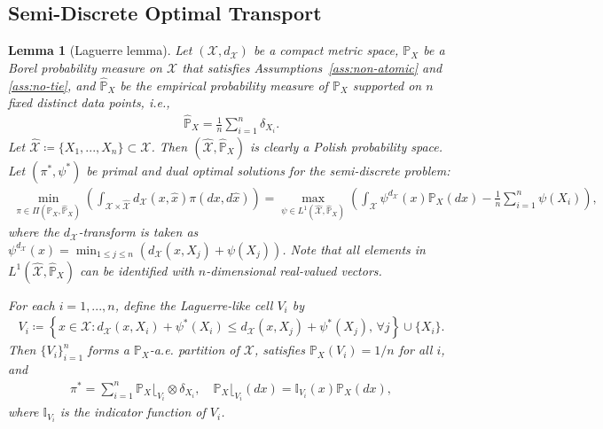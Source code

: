 \documentclass{article}
\theoremstyle{plain}
\newtheorem{lemma}[theorem]{Lemma}
\theoremstyle{definition}
\theoremstyle{remark}
\begin{document}
\subsection{Semi-Discrete Optimal Transport}
\begin{lemma}[Laguerre lemma]
	\label{lem:laguerre}
	Let $(\mathcal{X},d_{\mathcal{X}})$ be a compact metric space, $\mathbb{P}_X$ be a Borel probability measure on $\mathcal{X}$ that satisfies Assumptions~\ref{ass:non-atomic} and \ref{ass:no-tie}, and $\hat{\mathbb{P}}_X$ be the empirical probability measure of $\mathbb{P}_X$ supported on $n$ fixed distinct data points, i.e.,
	\begin{align*}
		\hat{\mathbb{P}}_X = \frac{1}{n} \sum_{i=1}^{n} \delta_{X_i} .
	\end{align*}
	Let $\hat{\mathcal{X}} \coloneqq \{X_1,...,X_n\} \subset \mathcal{X}$. Then $(\hat{\mathcal{X}},\hat{\mathbb{P}}_X)$ is clearly a Polish probability space. Let $(\pi^*,\psi^*)$ be primal and dual optimal solutions for the semi-discrete problem:
	\begin{align*}
		\min_{\pi \in \Pi(\mathbb{P}_X,\hat{\mathbb{P}}_X)}\left(\int_{\mathcal{X} \times \hat{\mathcal{X}}} d_{\mathcal{X}}(x,\hat{x}) \pi(dx,d\hat{x})\right) = \max_{\psi \in L^1(\hat{\mathcal{X}},\hat{\mathbb{P}}_X)} \left( \int_{\mathcal{X}} \psi^{d_{\mathcal{X}}}(x) \mathbb{P}_X(dx) - \frac{1}{n}\sum_{i=1}^{n} \psi(X_i) \right) ,
	\end{align*}
	where the ${d_{\mathcal{X}}}$-transform is taken as $\psi^{d_{\mathcal{X}}}(x) = \min_{1 \le j \le n} (d_{\mathcal{X}}(x,X_j) + \psi(X_j))$. Note that all elements in $L^1(\hat{\mathcal{X}},\hat{\mathbb{P}}_X)$ can be identified with $n$-dimensional real-valued vectors.
	
	For each $i= 1,...,n$, define the Laguerre-like cell $V_i$ by
	\begin{align*}
		V_i \coloneqq \left\{x \in \mathcal{X} : d_{\mathcal{X}}(x,X_i) + \psi^*(X_i) \leq d_{\mathcal{X}}(x,X_j) + \psi^*(X_j) , \, \forall j\right\} \cup \{X_i\} .	
	\end{align*}
	Then $\{V_i\}_{i=1}^n$ forms a $\mathbb{P}_X$-a.e. partition of $\mathcal{X}$, satisfies $\mathbb{P}_X(V_i)=1/n$ for all $i$, and
	\begin{align*}
		\pi^* = \sum_{i=1}^{n} \mathbb{P}_X\lfloor_{V_i} \otimes \delta_{X_i} , \quad \mathbb{P}_X\lfloor_{V_i}(dx) = \mathbb{I}_{V_i}(x)\mathbb{P}_X(dx) ,
	\end{align*}
	where $\mathbb{I}_{V_i}$ is the indicator function of $V_i$.
\end{lemma}
\end{document}
